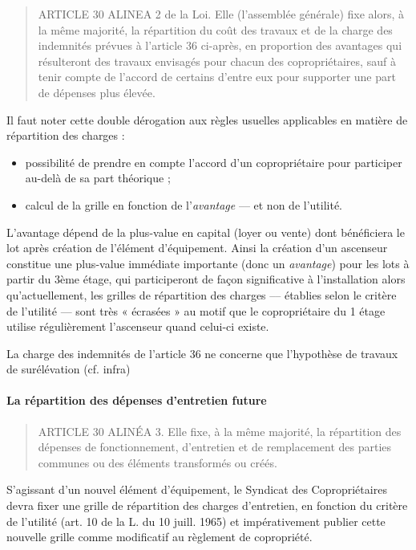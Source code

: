 				\begin{quote}
					ARTICLE 30 ALINEA 2 de la Loi. Elle (l’assemblée générale) fixe alors, à la même majorité, la répartition du coût des travaux et de la charge des indemnités prévues à l'article 36 ci-après, en proportion des avantages qui résulteront des travaux envisagés pour chacun des copropriétaires, sauf à tenir compte de l'accord de certains d'entre eux pour supporter une part de dépenses plus élevée.
				\end{quote}
				
				Il faut noter cette double dérogation aux règles usuelles applicables en matière de répartition des charges :
				\begin{itemize}
					\item possibilité de prendre en compte l’accord d’un copropriétaire pour participer au-delà de sa part théorique ;
					\item calcul de la grille en fonction de l’\emph{avantage} –-- et non de l’utilité.
				\end{itemize}
				
				L’avantage dépend de la plus-value en capital (loyer ou vente) dont bénéficiera le lot après création de l’élément d’équipement. Ainsi la création d’un ascenseur constitue une plus-value immédiate importante (donc un \emph{avantage}) pour les lots à partir du 3ème étage, qui participeront de façon significative à l’installation alors qu’actuellement, les grilles de répartition des charges –-- établies selon le critère de l’utilité --- sont très « écrasées » au motif que le copropriétaire du 1\ier{} étage utilise régulièrement l’ascenseur quand celui-ci existe.
				
				La charge des indemnités de l’article 36 ne concerne que l’hypothèse de travaux de surélévation (cf. infra)
			
			\paragraph{La répartition des dépenses d’entretien future}
			
				\begin{quote}
					ARTICLE 30 ALINÉA 3. Elle fixe, à la même majorité, la répartition des dépenses de fonctionnement, d'entretien et de remplacement des parties communes ou des éléments transformés ou créés.
				\end{quote}
				
				S’agissant d’un nouvel élément d’équipement, le Syndicat des Copropriétaires devra fixer une grille de répartition des charges d’entretien, en fonction du critère de l’utilité (art. 10 de la L. du 10 juill. 1965) et impérativement publier cette nouvelle grille comme modificatif au règlement de copropriété.
			

